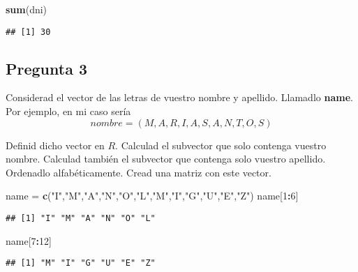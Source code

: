 \documentclass[
]{article}
\newenvironment{Shaded}{\begin{snugshade}}{\end{snugshade}}
\newcommand{\DecValTok}[1]{\textcolor[rgb]{0.00,0.00,0.81}{#1}}
\newcommand{\KeywordTok}[1]{\textcolor[rgb]{0.13,0.29,0.53}{\textbf{#1}}}
\newcommand{\NormalTok}[1]{#1}
\newcommand{\OperatorTok}[1]{\textcolor[rgb]{0.81,0.36,0.00}{\textbf{#1}}}
\newcommand{\StringTok}[1]{\textcolor[rgb]{0.31,0.60,0.02}{#1}}
\begin{document}
\begin{Shaded}
\begin{Highlighting}[]
\KeywordTok{sum}\NormalTok{(dni)}
\end{Highlighting}
\end{Shaded}

\begin{verbatim}
## [1] 30
\end{verbatim}

\hypertarget{pregunta-3}{%
\subsection{Pregunta 3}\label{pregunta-3}}

Considerad el vector de las letras de vuestro nombre y apellido.
Llamadlo \textbf{name}. Por ejemplo, en mi caso sería
\[nombre = (M,A,R,I,A,S,A,N,T,O,S)\]

Definid dicho vector en \(R\). Calculad el subvector que solo contenga
vuestro nombre. Calculad también el subvector que contenga solo vuestro
apellido. Ordenadlo alfabéticamente. Cread una matriz con este vector.

\begin{Shaded}
\begin{Highlighting}[]
\NormalTok{name =}\StringTok{ }\KeywordTok{c}\NormalTok{(}\StringTok{"I"}\NormalTok{,}\StringTok{"M"}\NormalTok{,}\StringTok{"A"}\NormalTok{,}\StringTok{"N"}\NormalTok{,}\StringTok{"O"}\NormalTok{,}\StringTok{"L"}\NormalTok{,}\StringTok{"M"}\NormalTok{,}\StringTok{"I"}\NormalTok{,}\StringTok{"G"}\NormalTok{,}\StringTok{"U"}\NormalTok{,}\StringTok{"E"}\NormalTok{,}\StringTok{"Z"}\NormalTok{)}
\NormalTok{name[}\DecValTok{1}\OperatorTok{:}\DecValTok{6}\NormalTok{]}
\end{Highlighting}
\end{Shaded}

\begin{verbatim}
## [1] "I" "M" "A" "N" "O" "L"
\end{verbatim}

\begin{Shaded}
\begin{Highlighting}[]
\NormalTok{name[}\DecValTok{7}\OperatorTok{:}\DecValTok{12}\NormalTok{]}
\end{Highlighting}
\end{Shaded}

\begin{verbatim}
## [1] "M" "I" "G" "U" "E" "Z"
\end{verbatim}
\end{document}
